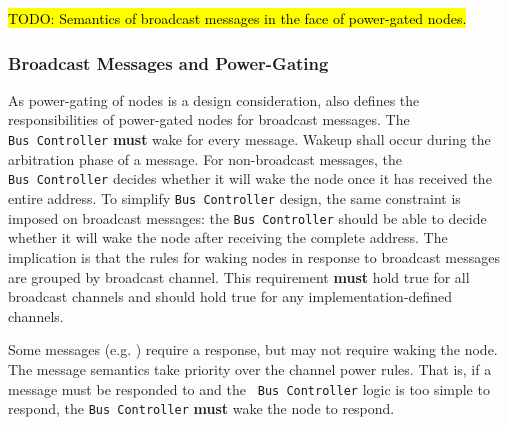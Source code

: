 \hl{TODO: Semantics of broadcast messages in the face of power-gated nodes.}

\subsubsection{Broadcast Messages and Power-Gating}
As power-gating of nodes is a \bus design consideration, \bus also defines the
responsibilities of power-gated nodes for broadcast messages. The {\tt
Bus~Controller} {\bf must} wake for every message. Wakeup shall occur during
the arbitration phase of a message. For non-broadcast messages, the {\tt
Bus~Controller} decides whether it will wake the node once it has received the
entire address. To simplify {\tt Bus~Controller} design, the same constraint
is imposed on broadcast messages: the {\tt Bus~Controller} should be able to
decide whether it will wake the node after receiving the complete address.
The implication is that the rules for waking nodes in response to broadcast
messages are grouped by broadcast channel. This requirement {\bf must} hold
true for all \bus broadcast channels and should hold true for any
implementation-defined channels.

Some messages (e.g. ) require a response, but may
not require waking the node. The message semantics take priority over the
channel power rules. That is, if a message must be responded to and the {\tt
Bus~Controller} logic is too simple to respond, the {\tt Bus~Controller} {\bf
must} wake the node to respond.

